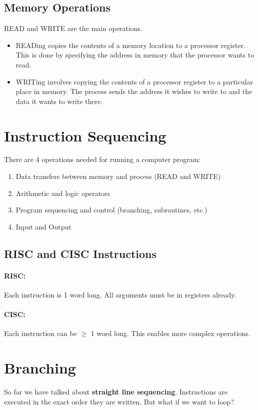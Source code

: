 \documentclass[a4paper,12pt]{report}
\begin{document}
\subsection{Memory Operations}
READ and WRITE are the main operations. 

\begin{itemize}
\item READing copies the contents of a memory location to a processor register. This is done by specifying 
the address in memory that the processor wants to read. 
\item WRITing involves copying the contents of a processor register to a particular 
place in memory. The process sends the address it wishes to write to and the data it wants to write there.
\end{itemize}

\section{Instruction Sequencing}
There are 4 operations needed for running a computer program:
\begin{enumerate}
\item Data transfers between memory and process (READ and WRITE)
\item Arithmetic and logic operators
\item Program sequencing and control (branching, subroutines, etc.)
\item Input and Output
\end{enumerate}

\subsection{RISC and CISC Instructions}
\paragraph{RISC: } Each instruction is 1 word long. All arguments must be in registers already.
\paragraph{CISC: } Each instruction can be $\geq$ 1 word long. This enables more complex operations.

\section{Branching}
So far we have talked about \textbf{straight line sequencing}. Instructions are executed in the exact order they are written. But what 
if we want to loop?
\end{document}
